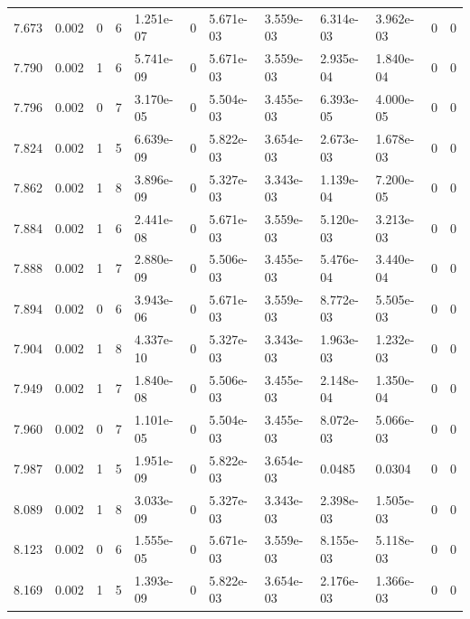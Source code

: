 \documentclass[preview]{standalone}
\begin{document}
{{{{{{\begin{tabular}{L{1.2cm}C{1.2cm} C{0.3cm}C{0.5cm} C{1.4cm}C{1.4cm} C{1.4cm}C{1.4cm} C{1.6cm}C{1.6cm} C{1.6cm}C{1.6cm}}
  7.673  &  0.002  & 0     &  6 &  1.251e-07  & 0  &  5.671e-03&   3.559e-03& 6.314e-03 & 3.962e-03   &  0 & 0  \\ 
  7.790  &  0.002  & 1     &  6 &  5.741e-09  & 0  &  5.671e-03&   3.559e-03& 2.935e-04 & 1.840e-04   &  0 & 0  \\ 
  7.796  &  0.002  & 0     &  7 &  3.170e-05  & 0  &  5.504e-03&   3.455e-03& 6.393e-05 & 4.000e-05   &  0 & 0  \\ 
  7.824  &  0.002  & 1     &  5 &  6.639e-09  & 0  &  5.822e-03&   3.654e-03& 2.673e-03 & 1.678e-03   &  0 & 0  \\ 
  7.862  &  0.002  & 1     &  8 &  3.896e-09  & 0  &  5.327e-03&   3.343e-03& 1.139e-04 & 7.200e-05   &  0 & 0  \\ 
  7.884  &  0.002  & 1     &  6 &  2.441e-08  & 0  &  5.671e-03&   3.559e-03& 5.120e-03 & 3.213e-03   &  0 & 0  \\ 
  7.888  &  0.002  & 1     &  7 &  2.880e-09  & 0  &  5.506e-03&   3.455e-03& 5.476e-04 & 3.440e-04   &  0 & 0  \\ 
  7.894  &  0.002  & 0     &  6 &  3.943e-06  & 0  &  5.671e-03&   3.559e-03& 8.772e-03 & 5.505e-03   &  0 & 0  \\ 
  7.904  &  0.002  & 1     &  8 &  4.337e-10  & 0  &  5.327e-03&   3.343e-03& 1.963e-03 & 1.232e-03   &  0 & 0  \\ 
  7.949  &  0.002  & 1     &  7 &  1.840e-08  & 0  &  5.506e-03&   3.455e-03& 2.148e-04 & 1.350e-04   &  0 & 0  \\ 
  7.960  &  0.002  & 0     &  7 &  1.101e-05  & 0  &  5.504e-03&   3.455e-03& 8.072e-03 & 5.066e-03   &  0 & 0  \\ 
  7.987  &  0.002  & 1     &  5 &  1.951e-09  & 0  &  5.822e-03&   3.654e-03& 0.0485 & 0.0304   &  0 & 0  \\ 
  8.089  &  0.002  & 1     &  8 &  3.033e-09  & 0  &  5.327e-03&   3.343e-03& 2.398e-03 & 1.505e-03   &  0 & 0  \\ 
  8.123  &  0.002  & 0     &  6 &  1.555e-05  & 0  &  5.671e-03&   3.559e-03& 8.155e-03 & 5.118e-03   &  0 & 0  \\ 
  8.169  &  0.002  & 1     &  5 &  1.393e-09  & 0  &  5.822e-03&   3.654e-03& 2.176e-03 & 1.366e-03   &  0 & 0  \\ 
\hline 
\end{tabular} 

}}}}}}
\end{document}
